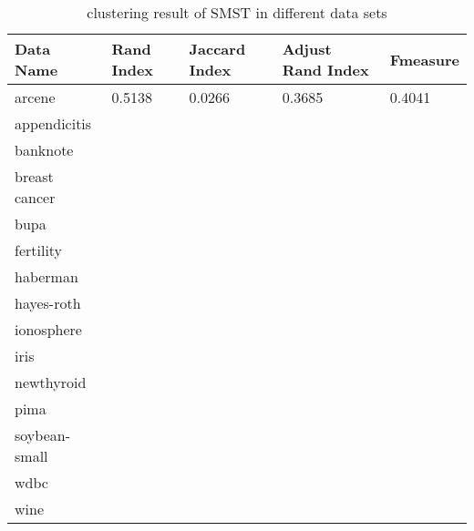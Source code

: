 	    \begin{table}[htb]
	      \centering
	      \caption{clustering result of SMST in different data sets}
	      \label{my-label}
	      \begin{tabular}{|lllll|}
	        \hline
	         Data Name & Rand Index  & Jaccard Index  & Adjust Rand Index & F\-measure  \\ \hline
	         arcene         & 0.5138 & 0.0266 & 0.3685 & 0.4041 \\ 
	         appendicitis   &  & &  &  \\ 
	         banknote       &  & &  &  \\ 
	         breast cancer  &  & &  & \\ 
	         bupa           &  & &  &  \\ 
	         fertility      &  & &  & \\ 
	         haberman       &  & &  &  \\ 
	         hayes-roth     &  & &  & \\ 
	         ionosphere     &  & &  &  \\ 
	         iris           &  & &  & \\ 
	         newthyroid     &  & &  &  \\ 
	         pima           &  & &  & \\ 
	         soybean-small  &  & &  & \\ 
	         wdbc           &  & &  & \\ 
	         wine           &  & &  &  \\ 
	         \hline
	      \end{tabular}
	    \end{table} 